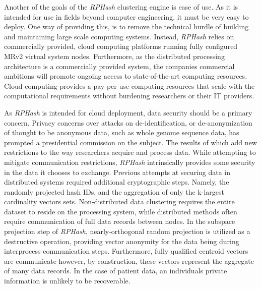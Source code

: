 \documentclass[a4paper,10pt]{article}
\begin{document}
Another of the goals of the \emph{RPHash} clustering engine is ease of use.
As it is intended for use in fields beyond computer engineering, it must be
very easy to deploy.  One way of providing this, is to remove the technical
hurdle of building and maintaining large scale computing systems.  Instead,
\emph{RPHash} relies on commercially provided, cloud computing platforms
running fully configured MRv2 virtual system nodes.  Furthermore, as the
distributed processing architecture is a commercially provided system, the
companies commercial ambitions will promote ongoing access to state-of-the-art
computing resources.  Cloud computing provides a pay-per-use computing
resources that scale with the computational requirements without burdening
researchers or their IT providers.

As \emph{RPHash} is intended for cloud deployment, data security should be
a primary concern.  Privacy concerns over attacks on de-identification,
or de-anonymization\cite{deanon1,deanon2} of thought to be anonymous
data, such as  whole genome sequence data\cite{deident}, has prompted a
presidential commission on the subject\cite{presidential}.  The results of
which add new restrictions to the way researchers acquire and process data.
While attempting to mitigate communication restrictions, \emph{RPHash}
intrinsically provides some security in the data it chooses to exchange.
Previous attempts at securing data in distributed systems required additional
cryptographic steps\cite{Lindell2000}.	Namely, the randomly projected hash
IDs, and the aggregation of only the k-largest cardinality vectors sets.
 Non-distributed data clustering requires the
entire dataset to reside on the processing system, while distributed
methods often require communication of full data records between nodes.
In the subspace projection step of \emph{RPHash}, nearly-orthogonal random
projection is utilized as a destructive operation, providing vector anonymity
for the data being during interprocess communication steps.  Furthermore,
fully qualified centroid vectors are communicate however, by construction,
these vectors represent the aggregate of many data records.  In the case of
patient data, an individuals private information is unlikely to be recoverable.
\end{document}
